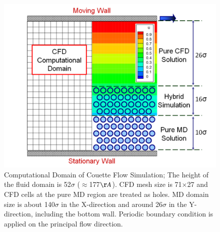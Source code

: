 \documentclass[preprint,12pt]{elsarticle}
\begin{document}
\begin{figure}
\centering
\includegraphics[width=0.8\linewidth]{Couette_Val_Domain.pdf}
\vskip-0.2cm
\caption{\small Computational Domain of Couette Flow Simulation; The height of the fluid domain is 52$\sigma$ ($\approx$177$\AA$). CFD mesh size is 71$\times$27 and CFD cells at the pure MD region are treated as holes. MD domain size is about 140$\sigma$ in the X-direction and around 26$\sigma$ in the Y-direction, including the bottom wall. Periodic boundary condition is applied on the principal flow direction.}
\label{Couette_Val_Domain}
\end{figure}


\end{document}

